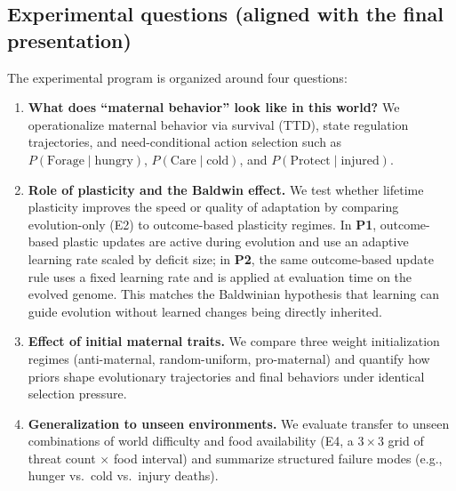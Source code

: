 \subsection{Experimental questions (aligned with the final presentation)}
The experimental program is organized around four questions:
\begin{enumerate}
    \item \textbf{What does ``maternal behavior'' look like in this world?} We operationalize maternal behavior via survival (TTD), state regulation trajectories, and need-conditional action selection such as $P(\text{Forage}\mid\text{hungry})$, $P(\text{Care}\mid\text{cold})$, and $P(\text{Protect}\mid\text{injured})$.
    \item \textbf{Role of plasticity and the Baldwin effect.} We test whether lifetime plasticity improves the speed or quality of adaptation by comparing evolution-only (E2) to outcome-based plasticity regimes. In \textbf{P1}, outcome-based plastic updates are active during evolution and use an adaptive learning rate scaled by deficit size; in \textbf{P2}, the same outcome-based update rule uses a fixed learning rate and is applied at evaluation time on the evolved genome. This matches the Baldwinian hypothesis that learning can guide evolution without learned changes being directly inherited.
    \item \textbf{Effect of initial maternal traits.} We compare three weight initialization regimes (anti-maternal, random-uniform, pro-maternal) and quantify how priors shape evolutionary trajectories and final behaviors under identical selection pressure.
    \item \textbf{Generalization to unseen environments.} We evaluate transfer to unseen combinations of world difficulty and food availability (E4, a $3\times 3$ grid of threat count $\times$ food interval) and summarize structured failure modes (e.g., hunger vs.\ cold vs.\ injury deaths).
\end{enumerate}





